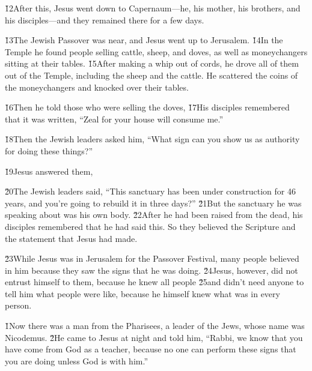 \v{12}After this, Jesus went down to Capernaum---he, his mother, his brothers, and his disciples---and they remained there for a few days.

\v{13}The Jewish Passover was near, and Jesus went up to Jerusalem. \v{14}In the Temple he found people selling cattle, sheep, and doves, as well as moneychangers sitting at their tables. \v{15}After making a whip out of cords, he drove all of them out of the Temple, including the sheep and the cattle. He scattered the coins of the moneychangers and knocked over their tables.

\v{16}Then he told those who were selling the doves,  \v{17}His disciples remembered that it was written, ``Zeal for your house will consume me.''

\v{18}Then the Jewish leaders asked him, ``What sign can you show us as authority for doing these things?''

\v{19}Jesus answered them, 

\v{20}The Jewish leaders said, ``This sanctuary has been under construction for 46 years, and you're going to rebuild it in three days?'' \v{21}But the sanctuary he was speaking about was his own body. \v{22}After he had been raised from the dead, his disciples remembered that he had said this. So they believed the Scripture and the statement that Jesus had made.

\v{23}While Jesus was in Jerusalem for the Passover Festival, many people believed in him because they saw the signs that he was doing. \v{24}Jesus, however, did not entrust himself to them, because he knew all people \v{25}and didn't need anyone to tell him what people were like, because he himself knew what was in every person.

\v{1}Now there was a man from the Pharisees, a leader of the Jews, whose name was Nicodemus. \v{2}He came to Jesus at night and told him, ``Rabbi, we know that you have come from God as a teacher, because no one can perform these signs that you are doing unless God is with him.''

